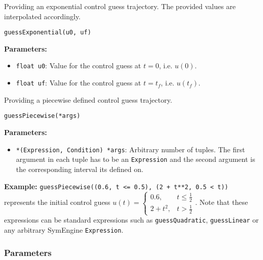 \documentclass[12pt]{article}
\begin{document}
\begin{mdframed}[backgroundcolor=gray!10, roundcorner=10pt, linewidth=1pt]

	Providing an exponential control guess trajectory. The provided values
	are interpolated accordingly.

	\begin{lstlisting}
guessExponential(u0, uf)
	\end{lstlisting}

	\textbf{Parameters:}
	\begin{itemize}
		\item \texttt{float u0}: Value for the control guess at $t=0$,
		      i.e. $u(0)$.
		\item \texttt{float uf}: Value for the control guess at
		      $t=t_f$, i.e. $u(t_f)$.
	\end{itemize}

\end{mdframed}

\begin{mdframed}[backgroundcolor=gray!10, roundcorner=10pt, linewidth=1pt]

	Providing a piecewise defined control guess trajectory.

	\begin{lstlisting}
guessPiecewise(*args)
	\end{lstlisting}

	\textbf{Parameters:}
	\begin{itemize}
		\item \texttt{*(Expression, Condition) *args}: Arbitrary number
		      of tuples. The first argument in each tuple has to be an
		      \texttt{Expression} and the second argument is the corresponding interval its
		      defined on.

	\end{itemize}

	\textbf{Example:} \texttt{guessPiecewise((0.6, t <= 0.5), (2 + t**2,
		0.5 < t))} represents the initial control guess $u(t) =
		\begin{cases}
			0.6,     & t \leq \frac{1}{2} \\
			2 + t^2, & t > \frac{1}{2}
		\end{cases}$. Note that these expressions can be standard
	expressions
	such as \texttt{guessQuadratic}, \texttt{guessLinear} or any arbitrary
	SymEngine \texttt{Expression}.
\end{mdframed}

\subsubsection{Parameters}
\end{document}

